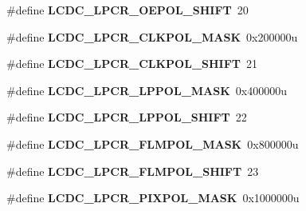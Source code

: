 \begin{DoxyCompactItemize}
\item 
\hypertarget{group___l_c_d_c___register___masks_ga73479218888f585dcbe4e3df5ded1080}{}\#define {\bfseries L\+C\+D\+C\+\_\+\+L\+P\+C\+R\+\_\+\+O\+E\+P\+O\+L\+\_\+\+S\+H\+I\+F\+T}~20\label{group___l_c_d_c___register___masks_ga73479218888f585dcbe4e3df5ded1080}

\item 
\hypertarget{group___l_c_d_c___register___masks_gac6e7727d1479d69460078669a1a24481}{}\#define {\bfseries L\+C\+D\+C\+\_\+\+L\+P\+C\+R\+\_\+\+C\+L\+K\+P\+O\+L\+\_\+\+M\+A\+S\+K}~0x200000u\label{group___l_c_d_c___register___masks_gac6e7727d1479d69460078669a1a24481}

\item 
\hypertarget{group___l_c_d_c___register___masks_gad6cb5f999a65c4c9323a60bc7b8110bc}{}\#define {\bfseries L\+C\+D\+C\+\_\+\+L\+P\+C\+R\+\_\+\+C\+L\+K\+P\+O\+L\+\_\+\+S\+H\+I\+F\+T}~21\label{group___l_c_d_c___register___masks_gad6cb5f999a65c4c9323a60bc7b8110bc}

\item 
\hypertarget{group___l_c_d_c___register___masks_ga95bfb28f07c232fc9a5c2df46cc30806}{}\#define {\bfseries L\+C\+D\+C\+\_\+\+L\+P\+C\+R\+\_\+\+L\+P\+P\+O\+L\+\_\+\+M\+A\+S\+K}~0x400000u\label{group___l_c_d_c___register___masks_ga95bfb28f07c232fc9a5c2df46cc30806}

\item 
\hypertarget{group___l_c_d_c___register___masks_gac3c916a2452d5c67d402edb6ff92067c}{}\#define {\bfseries L\+C\+D\+C\+\_\+\+L\+P\+C\+R\+\_\+\+L\+P\+P\+O\+L\+\_\+\+S\+H\+I\+F\+T}~22\label{group___l_c_d_c___register___masks_gac3c916a2452d5c67d402edb6ff92067c}

\item 
\hypertarget{group___l_c_d_c___register___masks_gaebd777c98db679a2753a29ab5f76b89e}{}\#define {\bfseries L\+C\+D\+C\+\_\+\+L\+P\+C\+R\+\_\+\+F\+L\+M\+P\+O\+L\+\_\+\+M\+A\+S\+K}~0x800000u\label{group___l_c_d_c___register___masks_gaebd777c98db679a2753a29ab5f76b89e}

\item 
\hypertarget{group___l_c_d_c___register___masks_gad486fd7f544994d1fa209ec22e415d19}{}\#define {\bfseries L\+C\+D\+C\+\_\+\+L\+P\+C\+R\+\_\+\+F\+L\+M\+P\+O\+L\+\_\+\+S\+H\+I\+F\+T}~23\label{group___l_c_d_c___register___masks_gad486fd7f544994d1fa209ec22e415d19}

\item 
\hypertarget{group___l_c_d_c___register___masks_ga7dea7561e704ad5f618025829c91820d}{}\#define {\bfseries L\+C\+D\+C\+\_\+\+L\+P\+C\+R\+\_\+\+P\+I\+X\+P\+O\+L\+\_\+\+M\+A\+S\+K}~0x1000000u\label{group___l_c_d_c___register___masks_ga7dea7561e704ad5f618025829c91820d}


\end{DoxyCompactItemize}
